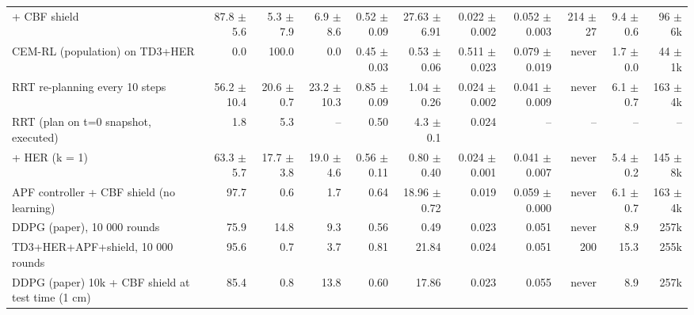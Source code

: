 \begin{table}[t]
\begin{tabular}{lrrrrrrrrrr}
+ CBF shield & 87.8 $\pm$ 5.6 & 5.3 $\pm$ 7.9 & 6.9 $\pm$ 8.6 & 0.52 $\pm$ 0.09 & 27.63 $\pm$ 6.91 & 0.022 $\pm$ 0.002 & 0.052 $\pm$ 0.003 & 214 $\pm$ 27 & 9.4 $\pm$ 0.6 & 96 $\pm$ 6k \\
CEM-RL (population) on TD3+HER & 0.0 & 100.0 & 0.0 & 0.45 $\pm$ 0.03 & 0.53 $\pm$ 0.06 & 0.511 $\pm$ 0.023 & 0.079 $\pm$ 0.019 & never & 1.7 $\pm$ 0.0 & 44 $\pm$ 1k \\
RRT re-planning every 10 steps & 56.2 $\pm$ 10.4 & 20.6 $\pm$ 0.7 & 23.2 $\pm$ 10.3 & 0.85 $\pm$ 0.09 & 1.04 $\pm$ 0.26 & 0.024 $\pm$ 0.002 & 0.041 $\pm$ 0.009 & never & 6.1 $\pm$ 0.7 & 163 $\pm$ 4k \\
RRT (plan on t=0 snapshot, executed) & 1.8 & 5.3 & -- & 0.50 & 4.3 $\pm$ 0.1 & 0.024 & -- & -- & -- & -- \\
+ HER (k = 1) & 63.3 $\pm$ 5.7 & 17.7 $\pm$ 3.8 & 19.0 $\pm$ 4.6 & 0.56 $\pm$ 0.11 & 0.80 $\pm$ 0.40 & 0.024 $\pm$ 0.001 & 0.041 $\pm$ 0.007 & never & 5.4 $\pm$ 0.2 & 145 $\pm$ 8k \\
APF controller + CBF shield (no learning) & 97.7 & 0.6 & 1.7 & 0.64 & 18.96 $\pm$ 0.72 & 0.019 & 0.059 $\pm$ 0.000 & never & 6.1 $\pm$ 0.7 & 163 $\pm$ 4k \\
DDPG (paper), 10 000 rounds & 75.9 & 14.8 & 9.3 & 0.56 & 0.49 & 0.023 & 0.051 & never & 8.9 & 257k \\
TD3+HER+APF+shield, 10 000 rounds & 95.6 & 0.7 & 3.7 & 0.81 & 21.84 & 0.024 & 0.051 & 200 & 15.3 & 255k \\
DDPG (paper) 10k + CBF shield at test time (1 cm) & 85.4 & 0.8 & 13.8 & 0.60 & 17.86 & 0.023 & 0.055 & never & 8.9 & 257k \\
\bottomrule
\end{tabular}
\end{table}